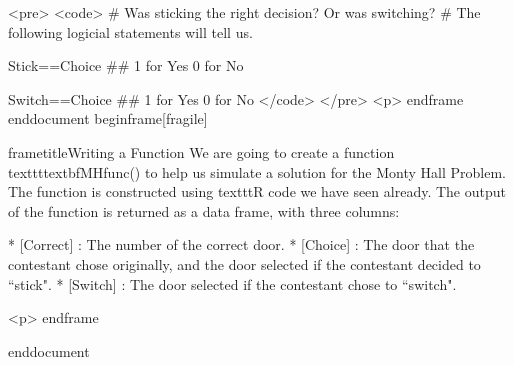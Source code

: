 	<pre>
		<code>	
		# Was sticking the right decision? Or was switching?
		# The following logicial statements  will tell us.
		
		Stick==Choice ## 1 for Yes 0 for No 
		
		Switch==Choice ## 1 for Yes 0 for No 
		</code> 
	</pre>
<p>
end{frame}
end{document}
begin{frame}[fragile]
	
	frametitle{Writing a Function}
	We are going to create a function texttt{textbf{MHfunc()}} to help us simulate a solution for the Monty Hall Problem. The function is constructed using texttt{R} code we have seen already. The output of the function is returned as a data frame, with three columns:
	 
		        * [Correct] : The number of the correct door.
		        * [Choice] :  The door that the contestant chose originally, and the door selected if the contestant decided to ``stick".
		        * [Switch] : The door selected if the contestant chose to ``switch".
	

<p>
end{frame}

end{document}

